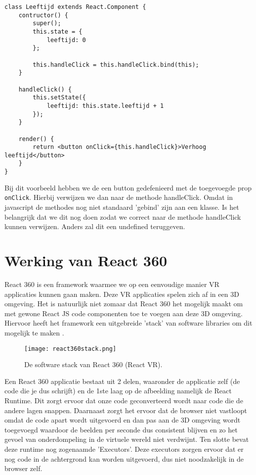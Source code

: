 \begin{lstlisting}[frame=single, caption=Voorbeeld van een vent afhandelen.]
class Leeftijd extends React.Component {
	contructor() {
		super();
		this.state = {
			leeftijd: 0
		};
		
		this.handleClick = this.handleClick.bind(this);
	}
	
	handleClick() {
		this.setState({
			leeftijd: this.state.leeftijd + 1
		});
	}

	render() {
		return <button onClick={this.handleClick}>Verhoog leeftijd</button>
	}
}
\end{lstlisting}

Bij dit voorbeeld hebben we de een button gedefenieerd met de toegevoegde prop \lstinline[basicstyle=\ttfamily\color{red}]|onClick|. Hierbij verwijzen we dan naar de methode handleClick. Omdat in javascript de methodes nog niet standaard 'gebind' zijn aan een klasse. Is het belangrijk dat we dit nog doen zodat we correct naar de methode handleClick kunnen verwijzen. Anders zal dit een undefined teruggeven.

\section{Werking van React 360}
\label{sec:werking-react360}


React 360 is een framework waarmee we op een eenvoudige manier VR applicaties kunnen gaan maken. Deze VR applicaties spelen zich af in een 3D omgeving. Het is natuurlijk niet zomaar dat React 360 het mogelijk maakt om met gewone React JS code componenten toe te voegen aan deze 3D omgeving. Hiervoor heeft het framework een uitgebreide 'stack' van software libraries om dit mogelijk te maken \autocite{Bieronski2016}.

\begin{figure}[H]
	\centering
	\texttt{[image: react360stack.png]}
	\caption{De software stack van React 360 (React VR).}
	\label{fig:react360-stack}
\end{figure}

Een React 360 applicatie bestaat uit 2 delen, waaronder de applicatie zelf (de code die je dus schrijft) en de 1ste laag op de afbeelding namelijk de React Runtime. Dit zorgt ervoor dat onze code geconverteerd wordt naar code die de andere lagen snappen. Daarnaast zorgt het ervoor dat de browser niet vastloopt omdat de code apart wordt uitgevoerd en dan pas aan de 3D omgeving wordt toegevoegd waardoor de beelden per seconde dus consistent blijven en zo het gevoel van onderdompeling in de virtuele wereld niet verdwijnt. Ten slotte bevat deze runtime nog zogenaamde 'Executors'. Deze executors zorgen ervoor dat er nog code in de achtergrond kan worden uitgevoerd, dus niet noodzakelijk in de browser zelf.

